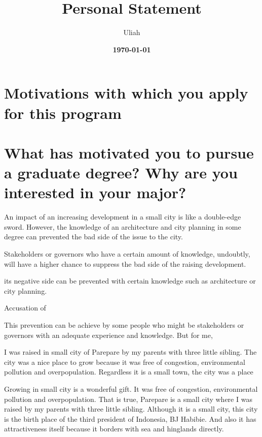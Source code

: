\documentclass[11pt]{simart} %
\title{
\textbf{Personal Statement} \\
} %
\date{\textbf{\today}}
\author{Uliah}
\begin{document}
\maketitle %

\section{Motivations with which you apply for this program}
\section*{What has motivated you to pursue a graduate degree? Why are you interested in your major?}

An impact of an increasing development in a small city is like a double-edge sword.
However, the knowledge of an architecture and city planning in some degree can prevented the bad side of the issue to the city.

Stakeholders or governors who have a certain amount of knowledge, undoubtly, will have a higher chance to suppress the bad side of the raising development.

its negative side can be prevented with certain knowledge such as architecture or city planning.

Accusation of

This prevention can be achieve by some people who might be stakeholders or governors with an adequate experience and knowledge. But for me,

I was raised in small city of Parepare by my parents with three little sibling. The city was a nice place to grow because it was free of congestion, environmental pollution and overpopulation. Regardless it is a small town, the city was a place

Growing in small city is a wonderful gift. It was free of congestion, environmental pollution and overpopulation. That is true, Parepare is a small city where I was raised by my parents with three little sibling. Although it is a small city, this city is the birth place of the third president of Indonesia, BJ Habibie. And also it has attractiveness itself because it borders with sea and hinglands directly.
\end{document}
